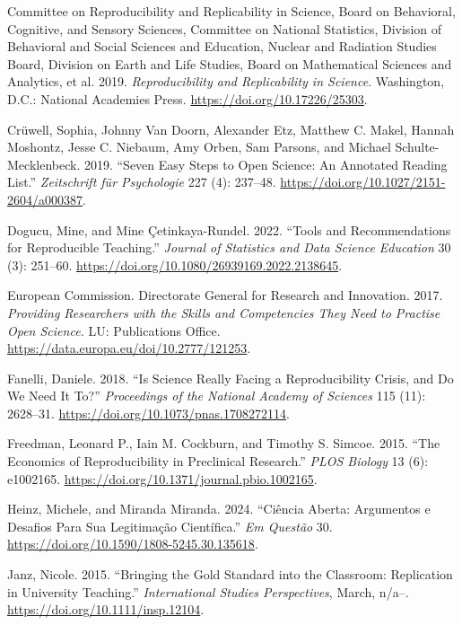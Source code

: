\documentclass[
  a4paper,
]{article}
\newlength{\cslhangindent}
\newenvironment{CSLReferences}[2] %
 {\begin{list}{}{%
  \setlength{\itemindent}{0pt}
  \setlength{\leftmargin}{0pt}
  \setlength{\parsep}{0pt}
  \ifodd #1
   \setlength{\leftmargin}{\cslhangindent}
   \setlength{\itemindent}{-1\cslhangindent}
  \fi
  \setlength{\itemsep}{#2\baselineskip}}}
 {\end{list}}
\begin{document}
\begin{CSLReferences}{1}{0}
Committee on Reproducibility and Replicability in Science, Board on
Behavioral, Cognitive, and Sensory Sciences, Committee on National
Statistics, Division of Behavioral and Social Sciences and Education,
Nuclear and Radiation Studies Board, Division on Earth and Life Studies,
Board on Mathematical Sciences and Analytics, et al. 2019.
\emph{Reproducibility and {Replicability} in {Science}}. Washington,
D.C.: National Academies Press. \url{https://doi.org/10.17226/25303}.

Crüwell, Sophia, Johnny Van Doorn, Alexander Etz, Matthew C. Makel,
Hannah Moshontz, Jesse C. Niebaum, Amy Orben, Sam Parsons, and Michael
Schulte-Mecklenbeck. 2019. {``Seven {Easy Steps} to {Open Science}: {An
Annotated Reading List}.''} \emph{Zeitschrift f{ü}r Psychologie} 227
(4): 237--48. \url{https://doi.org/10.1027/2151-2604/a000387}.

Dogucu, Mine, and Mine Çetinkaya-Rundel. 2022. {``Tools and
{Recommendations} for {Reproducible Teaching}.''} \emph{Journal of
Statistics and Data Science Education} 30 (3): 251--60.
\url{https://doi.org/10.1080/26939169.2022.2138645}.

European Commission. Directorate General for Research and Innovation.
2017. \emph{Providing Researchers with the Skills and Competencies They
Need to Practise {Open Science}.} LU: Publications Office.
\url{https://data.europa.eu/doi/10.2777/121253}.

Fanelli, Daniele. 2018. {``Is Science Really Facing a Reproducibility
Crisis, and Do We Need It To?''} \emph{Proceedings of the National
Academy of Sciences} 115 (11): 2628--31.
\url{https://doi.org/10.1073/pnas.1708272114}.

Freedman, Leonard P., Iain M. Cockburn, and Timothy S. Simcoe. 2015.
{``The {Economics} of {Reproducibility} in {Preclinical Research}.''}
\emph{PLOS Biology} 13 (6): e1002165.
\url{https://doi.org/10.1371/journal.pbio.1002165}.

Heinz, Michele, and Miranda Miranda. 2024. {``Ci{ê}ncia {Aberta}:
Argumentos e Desafios Para Sua Legitima{ç}{ã}o Cient{í}fica.''} \emph{Em
Quest{ã}o} 30. \url{https://doi.org/10.1590/1808-5245.30.135618}.

Janz, Nicole. 2015. {``Bringing the {Gold Standard} into the
{Classroom}: {Replication} in {University Teaching}.''}
\emph{International Studies Perspectives}, March, n/a--.
\url{https://doi.org/10.1111/insp.12104}.


\end{CSLReferences}
\end{document}
